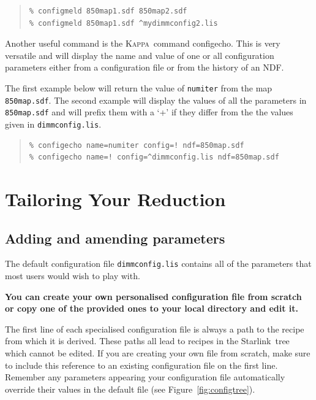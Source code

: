 \documentclass[twoside,11pt]{article}
\newcommand{\htmladdnormallink}[2]{#1}
\newcommand{\htmlref}[2]{#1}
\newcommand{\latexhtml}[2]{#1}
\newcommand{\xref}[3]{#1}
\newcommand{\xlabel}[1]{}
\renewcommand{\_}{\texttt{\symbol{95}}}
\newenvironment{myquote}{
   \color{MidnightBlue}\begin{quote}\begin{small}}{
   \end{small}\end{quote}
}
\newcommand{\starlink}{\htmladdnormallink{Starlink}{http://starlink.jach.hawaii.edu}}
\newcommand{\Kappa}{\xref{\textsc{Kappa}}{sun95}{}}
\newcommand{\task}[1]{\textsf{#1}}
\newcommand{\param}[1]{\texttt{#1}}
\newcommand{\file}[1]{\texttt{#1}}
\newcommand{\configecho}{\xref{\task{configecho}}{sun95}{CONFIGECHO}}
\newcommand{\cref}[3]{\latexhtml{#1~\ref{#2}}{\htmlref{#3}{#2}}}
\renewenvironment{myquote}{
      \begin{quote}\begin{small}}{
      \end{small}\end{quote}
   }
\begin{document}
\begin{myquote}
\begin{verbatim}
% configmeld 850map1.sdf 850map2.sdf
% configmeld 850map1.sdf ^mydimmconfig2.lis
\end{verbatim}
\end{myquote}
Another useful command is the \Kappa\ command \configecho.
This is very versatile and will display the name and value of one or
all configuration parameters either from a configuration file or from
the history of an NDF.

The first example below will return the value of \param{numiter} from
the map \file{850map.sdf}. The second example will display the values of all
the parameters in \file{850map.sdf} and will prefix them with a `+' if they
differ from the the values given in \file{dimmconfig.lis}.

\begin{myquote}
\begin{verbatim}
% configecho name=numiter config=! ndf=850map.sdf
% configecho name=! config=^dimmconfig.lis ndf=850map.sdf
\end{verbatim}
\end{myquote}


\clearpage
\section{\xlabel{tweak}Tailoring Your Reduction}
\label{sec:tweak}


\subsection{Adding and amending parameters}
The default configuration file \file{dimmconfig.lis} contains all of
the parameters that most users would wish to play with.

\textbf{You can create your own personalised configuration file from
scratch or copy one of the provided ones to your local directory and
edit it.}

The first line of each specialised configuration file is always a path
to the recipe from which it is derived. These paths all lead to
recipes in the \starlink\ tree which cannot be edited. If you are
creating your own file from scratch, make sure to include this
reference to an existing configuration file on the first line.
Remember any parameters appearing your configuration file
automatically override their values in the default file (see
\cref{Figure}{fig:configtree}{this figure}).
\end{document}
